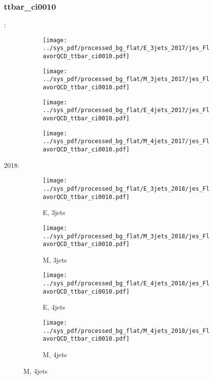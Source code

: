 \documentclass{beamer}
\begin{document}
\begin{frame}
\frametitle{ttbar_ci0010}
\fontsize{5}{1}:
\begin{figure}
\centering
\begin{subfigure}[b]{0.24\textwidth}
\texttt{[image: ../sys\_pdf/processed\_bg\_flat/E\_3jets\_2017/jes\_FlavorQCD\_ttbar\_ci0010.pdf]}
\end{subfigure}
\begin{subfigure}[b]{0.24\textwidth}
\texttt{[image: ../sys\_pdf/processed\_bg\_flat/M\_3jets\_2017/jes\_FlavorQCD\_ttbar\_ci0010.pdf]}
\end{subfigure}
\begin{subfigure}[b]{0.24\textwidth}
\texttt{[image: ../sys\_pdf/processed\_bg\_flat/E\_4jets\_2017/jes\_FlavorQCD\_ttbar\_ci0010.pdf]}
\end{subfigure}
\begin{subfigure}[b]{0.24\textwidth}
\texttt{[image: ../sys\_pdf/processed\_bg\_flat/M\_4jets\_2017/jes\_FlavorQCD\_ttbar\_ci0010.pdf]}
\end{subfigure}
\end{figure}
2018:
\begin{figure}
\centering
\begin{subfigure}[b]{0.24\textwidth}
\texttt{[image: ../sys\_pdf/processed\_bg\_flat/E\_3jets\_2018/jes\_FlavorQCD\_ttbar\_ci0010.pdf]}
\captionsetup{font=tiny}
\caption{E, 3jets}
\end{subfigure}
\begin{subfigure}[b]{0.24\textwidth}
\texttt{[image: ../sys\_pdf/processed\_bg\_flat/M\_3jets\_2018/jes\_FlavorQCD\_ttbar\_ci0010.pdf]}
\captionsetup{font=tiny}
\caption{M, 3jets}
\end{subfigure}
\begin{subfigure}[b]{0.24\textwidth}
\texttt{[image: ../sys\_pdf/processed\_bg\_flat/E\_4jets\_2018/jes\_FlavorQCD\_ttbar\_ci0010.pdf]}
\captionsetup{font=tiny}
\caption{E, 4jets}
\end{subfigure}
\begin{subfigure}[b]{0.24\textwidth}
\texttt{[image: ../sys\_pdf/processed\_bg\_flat/M\_4jets\_2018/jes\_FlavorQCD\_ttbar\_ci0010.pdf]}
\captionsetup{font=tiny}
\caption{M, 4jets}
\end{subfigure}
\end{figure}
\end{frame}
\end{document}
